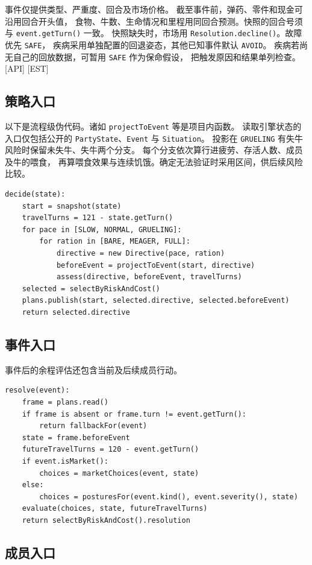 \documentclass[UTF8,11pt,a4paper]{ctexart}
\newcommand{\src}[1]{\textup{\small\textcolor{muted}{[#1]}}}
\newcommand{\api}[1]{\texttt{#1}}
\begin{document}
事件仅提供类型、严重度、回合及市场价格。
截至事件前，弹药、零件和现金可沿用回合开头值，
食物、牛数、生命情况和里程用同回合预测。快照的回合号须与 \api{event.getTurn()} 一致。
快照缺失时，市场用 \api{Resolution.decline()}。故障优先 \api{SAFE}，
疾病采用单独配置的回退姿态，其他已知事件默认 \api{AVOID}。
疾病若尚无自己的回放数据，可暂用 \api{SAFE} 作为保命假设，
把触发原因和结果单列检查。 \src{API} \src{EST}

\subsection{策略入口}

以下是流程级伪代码。诸如 \api{projectToEvent} 等是项目内函数。
读取引擎状态的入口仅包括公开的 \api{PartyState}、\api{Event} 与 \api{Situation}。
投影在 \api{GRUELING} 有失牛风险时保留未失牛、失牛两个分支。
每个分支依次算行进疲劳、存活人数、成员及牛的喂食，
再算喂食效果与连续饥饿。确定无法验证时采用区间，供后续风险比较。

\begin{lstlisting}
decide(state):
    start = snapshot(state)
    travelTurns = 121 - state.getTurn()
    for pace in [SLOW, NORMAL, GRUELING]:
        for ration in [BARE, MEAGER, FULL]:
            directive = new Directive(pace, ration)
            beforeEvent = projectToEvent(start, directive)
            assess(directive, beforeEvent, travelTurns)
    selected = selectByRiskAndCost()
    plans.publish(start, selected.directive, selected.beforeEvent)
    return selected.directive
\end{lstlisting}

\clearpage
\subsection{事件入口}

事件后的余程评估还包含当前及后续成员行动。

\begin{lstlisting}
resolve(event):
    frame = plans.read()
    if frame is absent or frame.turn != event.getTurn():
        return fallbackFor(event)
    state = frame.beforeEvent
    futureTravelTurns = 120 - event.getTurn()
    if event.isMarket():
        choices = marketChoices(event, state)
    else:
        choices = posturesFor(event.kind(), event.severity(), state)
    evaluate(choices, state, futureTravelTurns)
    return selectByRiskAndCost().resolution
\end{lstlisting}

\subsection{成员入口}
\end{document}
